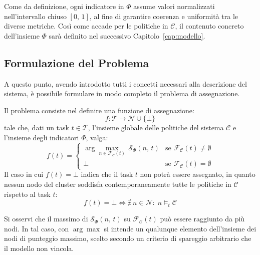 Come da definizione, ogni indicatore in $\Phi$ assume valori normalizzati nell'intervallo chiuso $[0,\, 1]$, al fine di garantire coerenza e uniformità tra le diverse metriche. Così come accade per le politiche in $\mathcal{C}$, il contenuto concreto dell'insieme $\Phi$ sarà definito nel successivo Capitolo~\ref{cap:modello}. 


\subsection{Formulazione del Problema}
\label{subsec:formulazione_problema}

A questo punto, avendo introdotto tutti i concetti necessari alla descrizione del sistema, è possibile formulare in modo completo il problema di assegnazione.

\begin{problem}
    \label{def:formulazione_problema}
    Il problema consiste nel definire una funzione di assegnazione:
    \begin{equation}
        f: \mathcal{T} \rightarrow \mathcal{N} \cup \{\bot\}
    \end{equation}
    tale che, dati un task $t \in \mathcal{T}$, l'insieme globale delle politiche del sistema $\mathcal{C}$ e l'insieme degli indicatori $\Phi$, valga:
    \begin{equation}
        f(t) =
        \begin{cases}
            \arg\max_{n \in \mathcal{F_C}(t)}\, \mathcal{S}_\Phi(n,\, t)
                & \text{se } \mathcal{F_C}(t) \neq \emptyset \\
            \bot
                & \text{se } \mathcal{F_C}(t) = \emptyset
        \end{cases}
    \end{equation}
    Il caso in cui $f(t) = \bot$ indica che il task $t$ non potrà essere assegnato, in quanto nessun nodo del cluster soddisfa contemporaneamente tutte le politiche in $\mathcal{C}$ rispetto al task $t$:
    \begin{equation}
        f(t) = \bot \iff \nexists\, n \in \mathcal{N} :\; n \models_t \mathcal{C}
    \end{equation}
\end{problem}

Si osservi che il massimo di $\mathcal{S}_\Phi(n,\, t)$ su $\mathcal{F_C}(t)$ può essere raggiunto da più nodi. In tal caso, con $\arg\max$ si intende un qualunque elemento dell'insieme dei nodi di punteggio massimo, scelto secondo un criterio di spareggio arbitrario che il modello non vincola. 

